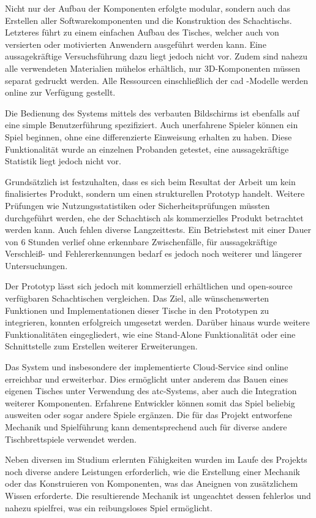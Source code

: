 Nicht nur der Aufbau der Komponenten erfolgte modular, sondern auch das
Erstellen aller Softwarekomponenten und die Konstruktion des
Schachtischs. Letzteres führt zu einem einfachen Aufbau des Tisches,
welcher auch von versierten oder motivierten Anwendern ausgeführt werden
kann. Eine aussagekräftige Versuchsführung dazu liegt jedoch nicht vor.
Zudem sind nahezu alle verwendeten Materialien mühelos erhältlich, nur
3D-Komponenten müssen separat gedruckt werden. Alle Ressourcen
einschließlich der \gls{cad} -Modelle werden online zur Verfügung
gestellt.

Die Bedienung des Systems mittels des verbauten Bildschirms ist
ebenfalls auf eine simple Benutzerführung spezifiziert. Auch unerfahrene
Spieler können ein Spiel beginnen, ohne eine differenzierte Einweisung
erhalten zu haben. Diese Funktionalität wurde an einzelnen Probanden
getestet, eine aussagekräftige Statistik liegt jedoch nicht vor.

Grundsätzlich ist festzuhalten, dass es sich beim Resultat der Arbeit um
kein finalisiertes Produkt, sondern um einen strukturellen Prototyp
handelt. Weitere Prüfungen wie Nutzungsstatistiken oder
Sicherheitsprüfungen müssten durchgeführt werden, ehe der Schachtisch
als kommerzielles Produkt betrachtet werden kann. Auch fehlen diverse
Langzeittests. Ein Betriebstest mit einer Dauer von 6 Stunden verlief
ohne erkennbare Zwischenfälle, für aussagekräftige Verschleiß- und
Fehlererkennungen bedarf es jedoch noch weiterer und längerer
Untersuchungen.

Der Prototyp lässt sich jedoch mit kommerziell erhältlichen und
open-source verfügbaren Schachtischen vergleichen. Das Ziel, alle
wünschenswerten Funktionen und Implementationen dieser Tische in den
Prototypen zu integrieren, konnten erfolgreich umgesetzt werden. Darüber
hinaus wurde weitere Funktionalitäten eingegliedert, wie eine
Stand-Alone Funktionalität oder eine Schnittstelle zum Erstellen
weiterer Erweiterungen.

Das System und insbesondere der implementierte Cloud-Service sind online
erreichbar und erweiterbar. Dies ermöglicht unter anderem das Bauen
eines eigenen Tisches unter Verwendung des \gls{atc}-Systems, aber auch
die Integration weiterer Komponenten. Erfahrene Entwickler können somit
das Spiel beliebig ausweiten oder sogar andere Spiele ergänzen. Die für
das Projekt entworfene Mechanik und Spielführung kann dementsprechend
auch für diverse andere Tischbrettspiele verwendet werden.

Neben diversen im Studium erlernten Fähigkeiten wurden im Laufe des
Projekts noch diverse andere Leistungen erforderlich, wie die Erstellung
einer Mechanik oder das Konstruieren von Komponenten, was das Aneignen
von zusätzlichem Wissen erforderte. Die resultierende Mechanik ist
ungeachtet dessen fehlerlos und nahezu spielfrei, was ein reibungsloses
Spiel ermöglicht.


